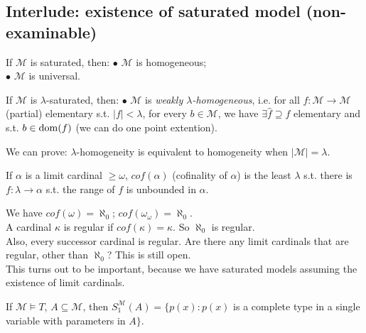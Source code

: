 \documentclass[a4paper]{article}
\begin{document}
\subsection{Interlude: existence of saturated model (non-examinable)}

If $\mathcal{M}$ is saturated, then:
$\bullet$ $\mathcal{M}$ is homogeneous;\\
$\bullet$ $\mathcal{M}$ is universal.

If $\mathcal{M}$ is $\lambda$-saturated, then:
$\bullet$ $\mathcal{M}$ is \emph{weakly $\lambda$-homogeneous}, i.e. for all $f:\mathcal{M} \to \mathcal{M}$ (partial) elementary s.t. $|f| < \lambda$, for every $b \in \mathcal{M}$, we have $\exists \hat{f} \supseteq f$ elementary and s.t. $b \in \operatorname{dom}(f)$ (we can do one point extention).

We can prove: $\lambda$-homogeneity is equivalent to homogeneity when $|\mathcal{M}| = \lambda$.

\begin{defi}
    If $\alpha$ is a limit cardinal $\geq \omega$, $cof(\alpha)$ (cofinality of $\alpha$) is the least $\lambda$ s.t. there is $f:\lambda \to \alpha$ s.t. the range of $f$ is unbounded in $\alpha$.
\end{defi}

We have $cof(\omega) = \aleph_0$; $cof(\omega_\omega) = \aleph_0$.\\
A cardinal $\kappa$ is regular if $cof(\kappa) = \kappa$. So $\aleph_0$ is regular.\\
Also, every successor cardinal is regular. Are there any limit cardinals that are regular, other than $\aleph_0$? This is still open.\\
This turns out to be important, because we have saturated models assuming the existence of limit cardinals.

If $\mathcal{M} \vDash T$, $A \subseteq \mathcal{M}$, then $S_1^\mathcal{M}(A) = \{p(x):p(x)$ is a complete type in a single variable with parameters in $A\}$.
\end{document}
